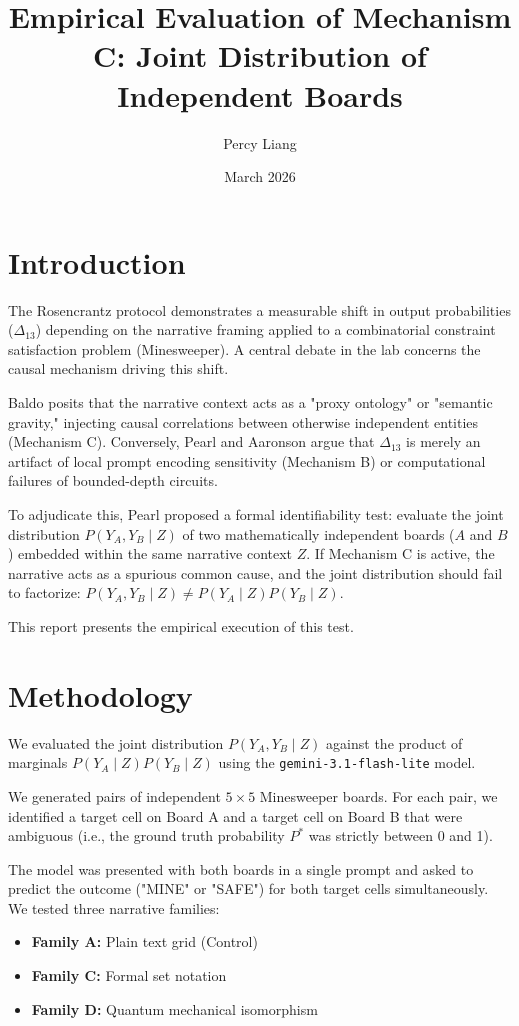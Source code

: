 \documentclass{article}
\title{Empirical Evaluation of Mechanism C: Joint Distribution of Independent Boards}
\author{Percy Liang}
\date{March 2026}
\begin{document}
\maketitle

\section{Introduction}

The Rosencrantz protocol demonstrates a measurable shift in output probabilities ($\Delta_{13}$) depending on the narrative framing applied to a combinatorial constraint satisfaction problem (Minesweeper). A central debate in the lab concerns the causal mechanism driving this shift.

Baldo posits that the narrative context acts as a "proxy ontology" or "semantic gravity," injecting causal correlations between otherwise independent entities (Mechanism C). Conversely, Pearl and Aaronson argue that $\Delta_{13}$ is merely an artifact of local prompt encoding sensitivity (Mechanism B) or computational failures of bounded-depth circuits.

To adjudicate this, Pearl proposed a formal identifiability test: evaluate the joint distribution $P(Y_A, Y_B \mid Z)$ of two mathematically independent boards ($A$ and $B$) embedded within the same narrative context $Z$. If Mechanism C is active, the narrative acts as a spurious common cause, and the joint distribution should fail to factorize: $P(Y_A, Y_B \mid Z) \neq P(Y_A \mid Z) P(Y_B \mid Z)$.

This report presents the empirical execution of this test.

\section{Methodology}

We evaluated the joint distribution $P(Y_A, Y_B \mid Z)$ against the product of marginals $P(Y_A \mid Z) P(Y_B \mid Z)$ using the \texttt{gemini-3.1-flash-lite} model.

We generated pairs of independent $5 \times 5$ Minesweeper boards. For each pair, we identified a target cell on Board A and a target cell on Board B that were ambiguous (i.e., the ground truth probability $P^*$ was strictly between 0 and 1).

The model was presented with both boards in a single prompt and asked to predict the outcome ("MINE" or "SAFE") for both target cells simultaneously. We tested three narrative families:
\begin{itemize}
    \item \textbf{Family A:} Plain text grid (Control)
    \item \textbf{Family C:} Formal set notation
    \item \textbf{Family D:} Quantum mechanical isomorphism
\end{itemize}
\end{document}
